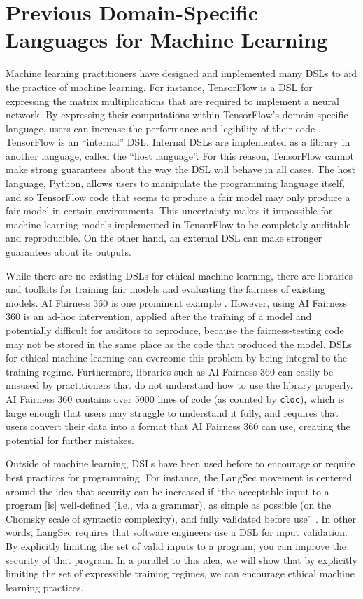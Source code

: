 \documentclass[letterpaper]{article}
\newcommand{\citep}[1]{\cite{#1}}
\begin{document}
\section{Previous Domain-Specific Languages for Machine Learning}
Machine learning practitioners have designed and implemented many DSLs to aid the practice of machine learning. For instance, TensorFlow is a DSL for expressing the matrix multiplications that are required to implement a neural network. By expressing their computations within TensorFlow’s domain-specific language, users can increase the performance and legibility of their code \citep{Abadi2016}. TensorFlow is an ``internal'' DSL. Internal DSLs are implemented as a library in another language, called the ``host language''. For this reason, TensorFlow cannot make strong guarantees about the way the DSL will behave in all cases. The host language, Python, allows users to manipulate the programming language itself, and so TensorFlow code that seems to produce a fair model may only produce a fair model in certain environments. This uncertainty makes it impossible for machine learning models implemented in TensorFlow to be completely auditable and reproducible. On the other hand, an external DSL can make stronger guarantees about its outputs. 

While there are no existing DSLs for ethical machine learning, there are libraries and toolkits for training fair models and evaluating the fairness of existing models. AI Fairness 360 is one prominent example \citep{Bellamy2018}. However, using AI Fairness 360 is an ad-hoc intervention, applied after the training of a model and potentially difficult for auditors to reproduce, because the fairness-testing code may not be stored in the same place as the code that produced the model. DSLs for ethical machine learning can overcome this problem by being integral to the training regime. Furthermore, libraries such as AI Fairness 360 can easily be misused by practitioners that do not understand how to use the library properly. AI Fairness 360 contains over 5000 lines of code (as counted by \texttt{cloc}), which is large enough that users may struggle to understand it fully, and requires that users convert their data into a format that AI Fairness 360 can use, creating the potential for further mistakes.

Outside of machine learning, DSLs have been used before to encourage or require best practices for programming. For instance, the LangSec movement is centered around the idea that security can be increased if ``the acceptable input to a program [is] well-defined (i.e., via a grammar), as simple as possible (on the Chomsky scale of syntactic complexity), and fully validated before use'' \citep{Momot2016}. In other words, LangSec requires that software engineers use a DSL for input validation. By explicitly limiting the set of valid inputs to a program, you can improve the security of that program. In a parallel to this idea, we will show that by explicitly limiting the set of expressible training regimes, we can encourage ethical machine learning practices.
\end{document}
